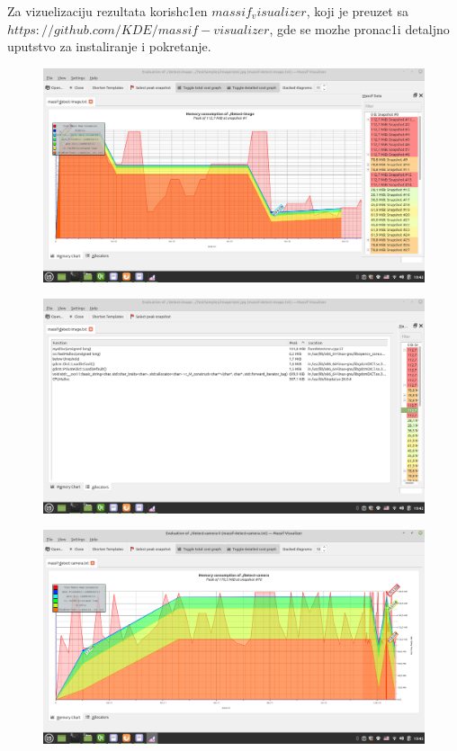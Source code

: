 \documentclass{article}
\begin{document}
Za vizuelizaciju rezultata korish\-c1en $massif_visualizer$, koji je preuzet sa \href{https://github.com/KDE/massif-visualizer}{$https://github.com/KDE/massif-visualizer$}, gde se mozhe pronac1i detaljno uputstvo za instaliranje i pokretanje.

\begin{figure}[H]
    \centering
    \includegraphics[width=12cm]{img/massif/massif_detect_image_memory.png}
    \caption{}
    \label{dim:massif}
\end{figure}
\begin{figure}[H]
    \centering
    \includegraphics[width=12cm]{img/massif/massif_detect_image_allocators.png}
    \caption{}
    \label{dima:massif}
\end{figure}

\begin{figure}[H]
    \centering
    \includegraphics[width=12cm]{img/massif/massif_detect_camera_memory1.png}
    \caption{}
    \label{dcm:massif}
\end{figure}
\end{document}
